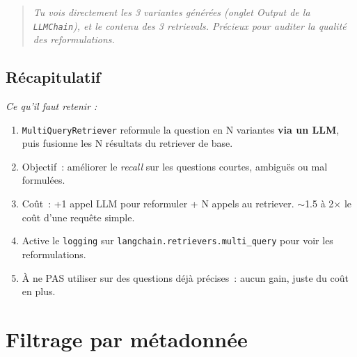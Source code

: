 \documentclass[11pt,a4paper]{article}
\begin{document}
\begin{quote}\itshape
Tu vois directement les 3 variantes générées (onglet \emph{Output} de
la \texttt{LLMChain}), et le contenu des 3 retrievals. Précieux pour
auditer la qualité des reformulations.
\end{quote}

\subsection*{Récapitulatif}
{\itshape\sloppy
\textit{Ce qu'il faut retenir :}
\begin{enumerate}[leftmargin=*]
  \item \texttt{MultiQueryRetriever} reformule la question en N variantes
        \textbf{via un LLM}, puis fusionne les N résultats du retriever
        de base.
  \item Objectif~: améliorer le \emph{recall} sur les questions courtes,
        ambiguës ou mal formulées.
  \item Coût~: +1 appel LLM pour reformuler + N appels au retriever.
        $\sim$1.5 à 2$\times$ le coût d'une requête simple.
  \item Active le \texttt{logging} sur \texttt{langchain.retrievers.multi\_query}
        pour voir les reformulations.
  \item À ne PAS utiliser sur des questions déjà précises~: aucun gain,
        juste du coût en plus.
\end{enumerate}
\par}

\section{Filtrage par métadonnée}
\end{document}
